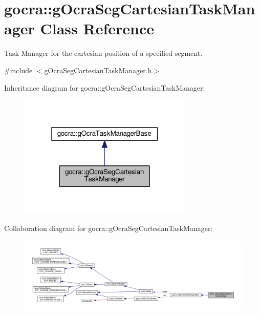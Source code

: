 \hypertarget{classgocra_1_1gOcraSegCartesianTaskManager}{}\section{gocra\+:\+:g\+Ocra\+Seg\+Cartesian\+Task\+Manager Class Reference}
\label{classgocra_1_1gOcraSegCartesianTaskManager}


Task Manager for the cartesian position of a specified segment.  




{\ttfamily \#include $<$g\+Ocra\+Seg\+Cartesian\+Task\+Manager.\+h$>$}



Inheritance diagram for gocra\+:\+:g\+Ocra\+Seg\+Cartesian\+Task\+Manager\+:
\nopagebreak
\begin{figure}[H]
\begin{center}
\leavevmode
\includegraphics[width=235pt]{db/dfa/classgocra_1_1gOcraSegCartesianTaskManager__inherit__graph}
\end{center}
\end{figure}


Collaboration diagram for gocra\+:\+:g\+Ocra\+Seg\+Cartesian\+Task\+Manager\+:
\nopagebreak
\begin{figure}[H]
\begin{center}
\leavevmode
\includegraphics[width=350pt]{d6/d7e/classgocra_1_1gOcraSegCartesianTaskManager__coll__graph}
\end{center}
\end{figure}
